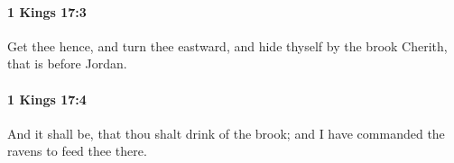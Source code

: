 		\paragraph{1 Kings 17:3} %
			\label{1KINGS-17-3}

			Get thee hence, and turn thee eastward, and hide thyself by the brook Cherith, that is before Jordan.


		\paragraph{1 Kings 17:4} %
			\label{1KINGS-17-4}

			And it shall be, that thou shalt drink of the brook; and I have commanded the ravens to feed thee there.


